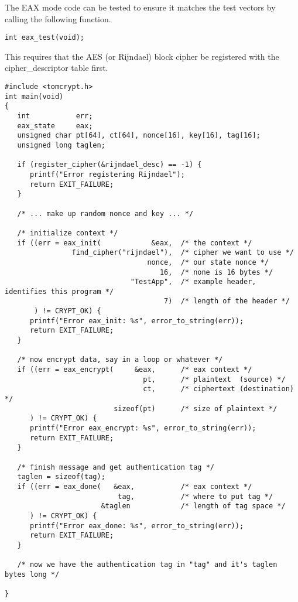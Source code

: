 \documentclass[a4paper]{book}
\begin{document}
The EAX mode code can be tested to ensure it matches the test vectors by calling the following function.
\begin{verbatim}
int eax_test(void);
\end{verbatim}
This requires that the AES (or Rijndael) block cipher be registered with the cipher\_descriptor table first.

\begin{verbatim}
#include <tomcrypt.h>
int main(void)
{
   int           err;
   eax_state     eax;
   unsigned char pt[64], ct[64], nonce[16], key[16], tag[16];
   unsigned long taglen;

   if (register_cipher(&rijndael_desc) == -1) {
      printf("Error registering Rijndael");
      return EXIT_FAILURE;
   }

   /* ... make up random nonce and key ... */

   /* initialize context */
   if ((err = eax_init(            &eax,  /* the context */
                find_cipher("rijndael"),  /* cipher we want to use */
                                  nonce,  /* our state nonce */
                                     16,  /* none is 16 bytes */
                              "TestApp",  /* example header, identifies this program */
                                      7)  /* length of the header */
       ) != CRYPT_OK) {
      printf("Error eax_init: %s", error_to_string(err));
      return EXIT_FAILURE;
   }

   /* now encrypt data, say in a loop or whatever */
   if ((err = eax_encrypt(     &eax,      /* eax context */
                                 pt,      /* plaintext  (source) */
                                 ct,      /* ciphertext (destination) */
                          sizeof(pt)      /* size of plaintext */
      ) != CRYPT_OK) {
      printf("Error eax_encrypt: %s", error_to_string(err));
      return EXIT_FAILURE;
   }

   /* finish message and get authentication tag */
   taglen = sizeof(tag);
   if ((err = eax_done(   &eax,           /* eax context */
                           tag,           /* where to put tag */
                       &taglen            /* length of tag space */
      ) != CRYPT_OK) {
      printf("Error eax_done: %s", error_to_string(err));
      return EXIT_FAILURE;
   }

   /* now we have the authentication tag in "tag" and it's taglen bytes long */

}
\end{verbatim}
                       
\end{document}
